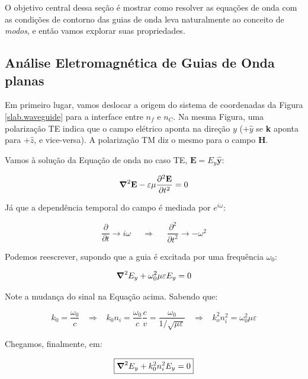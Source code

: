 \documentclass[12pt,a4paper]{report}
\begin{document}
O objetivo central dessa seção é mostrar como resolver as equações de onda com as condições de contorno das guias de onda leva naturalmente ao conceito de \textit{modos}, e então vamos explorar suas propriedades.

\subsection{Análise Eletromagnética de Guias de Onda planas}

Em primeiro lugar, vamos deslocar a origem do sistema de coordenadas da Figura \ref{slab.waveguide} para a interface entre $n_f$ e $n_C$. Na mesma Figura, uma polarização TE indica que o campo elétrico aponta na direção $y$ ($+\hat{y}$ se \textbf{k} aponta para $+\hat{z}$, e vice-versa). A polarização TM diz o mesmo para o campo $\textbf{H}$.

Vamos à solução da Equação de onda no caso TE, $\textbf{E}=E_y\hat{\textbf{y}}$:

\begin{equation*}
    \grad^2{\textbf{E}}-\varepsilon\mu\frac{\partial^2\textbf{E}}{\partial t^2}=0
\end{equation*}

Já que a dependência temporal do campo é mediada por $e^{i\omega}$:

\begin{equation*}
    \frac{\partial}{\partial t} \rightarrow i\omega\;\;\;\;\;\Rightarrow\;\;\;\;\;\frac{\partial^2}{\partial t^2} \rightarrow -\omega^2
\end{equation*}

Podemos reescrever, supondo que a guia é excitada por uma frequência $\omega_0$:

\begin{equation*}
    \grad^2E_y+\omega_0^2\mu\varepsilon E_y=0
\end{equation*}

Note a mudança do sinal na Equação acima. Sabendo que:

\begin{equation*}
    k_0=\frac{\omega_0}{c}\;\;\; \Rightarrow\;\;\; k_0n_i=\frac{\omega_0}{c}\frac{c}{v}=\frac{\omega_0}{1/\sqrt{\mu\varepsilon}}\;\;\;\Rightarrow\;\;\; k_o^2n_i^2=\omega_0^2\mu\varepsilon
\end{equation*}

Chegamos, finalmente, em:

\begin{equation}
    \boxed{\grad^2E_y+k_0^2n_i^2 E_y=0}
\end{equation}
\end{document}
